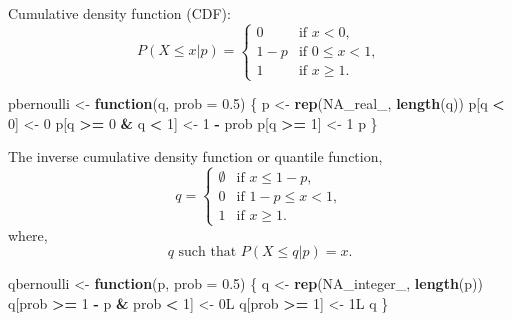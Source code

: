 \documentclass[]{book}
\newenvironment{Shaded}{\begin{snugshade}}{\end{snugshade}}
\newcommand{\KeywordTok}[1]{\textcolor[rgb]{0.13,0.29,0.53}{\textbf{#1}}}
\newcommand{\DataTypeTok}[1]{\textcolor[rgb]{0.13,0.29,0.53}{#1}}
\newcommand{\DecValTok}[1]{\textcolor[rgb]{0.00,0.00,0.81}{#1}}
\newcommand{\FloatTok}[1]{\textcolor[rgb]{0.00,0.00,0.81}{#1}}
\newcommand{\StringTok}[1]{\textcolor[rgb]{0.31,0.60,0.02}{#1}}
\newcommand{\OtherTok}[1]{\textcolor[rgb]{0.56,0.35,0.01}{#1}}
\newcommand{\ControlFlowTok}[1]{\textcolor[rgb]{0.13,0.29,0.53}{\textbf{#1}}}
\newcommand{\OperatorTok}[1]{\textcolor[rgb]{0.81,0.36,0.00}{\textbf{#1}}}
\newcommand{\NormalTok}[1]{#1}
\theoremstyle{definition}
\theoremstyle{definition}
\theoremstyle{definition}
\theoremstyle{remark}
\begin{document}
Cumulative density function (CDF): \[
P(X \leq x|p) = \begin{cases}
0 & \text{if } x < 0 , \\
1 - p & \text{if } 0 \leq x < 1 ,\\
1 & \text{if } x \geq 1 .
\end{cases}
\]

\begin{Shaded}
\begin{Highlighting}[]
\NormalTok{pbernoulli <-}\StringTok{ }\ControlFlowTok{function}\NormalTok{(q, }\DataTypeTok{prob =} \FloatTok{0.5}\NormalTok{) \{}
\NormalTok{  p <-}\StringTok{ }\KeywordTok{rep}\NormalTok{(}\OtherTok{NA_real_}\NormalTok{, }\KeywordTok{length}\NormalTok{(q))}
\NormalTok{  p[q }\OperatorTok{<}\StringTok{ }\DecValTok{0}\NormalTok{] <-}\StringTok{ }\DecValTok{0}
\NormalTok{  p[q }\OperatorTok{>=}\StringTok{ }\DecValTok{0} \OperatorTok{&}\StringTok{ }\NormalTok{q }\OperatorTok{<}\StringTok{ }\DecValTok{1}\NormalTok{] <-}\StringTok{ }\DecValTok{1} \OperatorTok{-}\StringTok{ }\NormalTok{prob}
\NormalTok{  p[q }\OperatorTok{>=}\StringTok{ }\DecValTok{1}\NormalTok{] <-}\StringTok{ }\DecValTok{1}
\NormalTok{  p}
\NormalTok{\}}
\end{Highlighting}
\end{Shaded}

The inverse cumulative density function or quantile function, \[
q =
\begin{cases}
\emptyset & \text{if } x \leq 1 - p, \\
0 & \text{if } 1 - p \leq x < 1 ,\\
1 & \text{if } x \geq 1 .
\end{cases}
\] where, \[
q \text{ such that } P(X \leq q|p) = x.
\]

\begin{Shaded}
\begin{Highlighting}[]
\NormalTok{qbernoulli <-}\StringTok{ }\ControlFlowTok{function}\NormalTok{(p, }\DataTypeTok{prob =} \FloatTok{0.5}\NormalTok{) \{}
\NormalTok{  q <-}\StringTok{ }\KeywordTok{rep}\NormalTok{(}\OtherTok{NA_integer_}\NormalTok{, }\KeywordTok{length}\NormalTok{(p))}
\NormalTok{  q[prob }\OperatorTok{>=}\StringTok{ }\DecValTok{1} \OperatorTok{-}\StringTok{ }\NormalTok{p }\OperatorTok{&}\StringTok{ }\NormalTok{prob }\OperatorTok{<}\StringTok{ }\DecValTok{1}\NormalTok{] <-}\StringTok{ }\NormalTok{0L}
\NormalTok{  q[prob }\OperatorTok{>=}\StringTok{ }\DecValTok{1}\NormalTok{] <-}\StringTok{ }\NormalTok{1L}
\NormalTok{  q}
\NormalTok{\}}
\end{Highlighting}
\end{Shaded}
\end{document}
